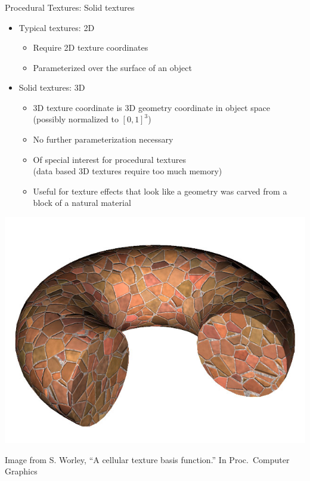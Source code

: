 \documentclass[utf8,stillsansserifmath,fleqn,t]{beamer}
\begin{document}
\begin{frame}[label=noise-6]
\frametitle{\insertsection}
Procedural Textures: Solid textures\\
\begin{itemize}
\item Typical textures: 2D
    \begin{itemize}
    \item Require 2D texture coordinates
    \item Parameterized over the surface of an object
    \end{itemize}
\item Solid textures: 3D
    \begin{itemize}
    \item 3D texture coordinate is 3D geometry coordinate in object space\\
        (possibly normalized to $[0,1]^3$)
    \item No further parameterization necessary
    \item Of special interest for procedural textures\\
        (data based 3D textures require too much memory)
    \item Useful for texture effects that look like a geometry was carved
    from a block of a natural material
    \end{itemize}
\end{itemize}
\begin{minipage}{.49\textwidth}
\centerline{\includegraphics[height=.2\textheight]{./fig/noise-example-solid-worley.png}}
\tiny Image from
S. Worley, ``A cellular texture basis function.'' In Proc.~Computer Graphics

\end{minipage}
\end{frame}
\end{document}
